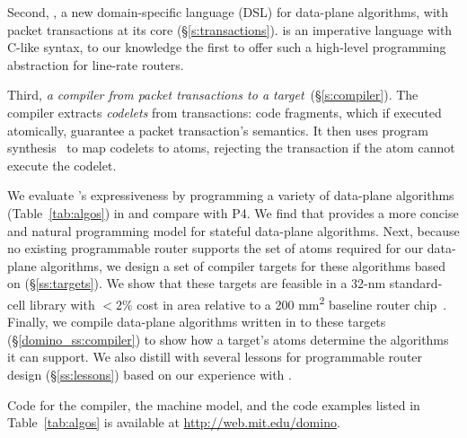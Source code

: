 Second, {\em \pktlanguage{}}, a new domain-specific language (DSL) for
data-plane algorithms, with packet transactions at its core
(\S\ref{s:transactions}).  \pktlanguage is an imperative language with C-like
syntax, to our knowledge the first to offer such a high-level programming
abstraction for line-rate routers.

Third, {\em a compiler from \pktlanguage packet transactions to a \absmachine
target}~(\S\ref{s:compiler}). The \pktlanguage compiler extracts {\em codelets}
from  transactions: code fragments, which if executed atomically, guarantee a
packet transaction's semantics. It then uses program
synthesis~\cite{sketch_asplos} to map codelets to atoms, rejecting the
transaction if the atom cannot execute the codelet.

We evaluate \pktlanguage's expressiveness by programming a variety of
data-plane algorithms (Table~\ref{tab:algos}) in \pktlanguage and compare with
P4. We find that \pktlanguage provides a more concise and natural programming
model for stateful data-plane algorithms.  Next, because no existing
programmable router supports the set of atoms required for our data-plane
algorithms, we design a set of compiler targets for these algorithms based on
\absmachine (\S\ref{ss:targets}).  We show that these targets are feasible in a
32-nm standard-cell library with $< 2\%$ cost in area relative to a 200
\si{\milli\metre\squared} baseline router chip~\cite{gibb_parsing}.
Finally, we compile data-plane algorithms written in \pktlanguage to these
targets (\S\ref{domino_ss:compiler}) to show how a target's atoms determine the
algorithms it can support. We also distill with several lessons for
programmable router design (\S\ref{ss:lessons}) based on our experience with
\pktlanguage.

Code for the \pktlanguage compiler, the \absmachine machine model, and the code
examples listed in Table~\ref{tab:algos} is available at
\url{http://web.mit.edu/domino}.
